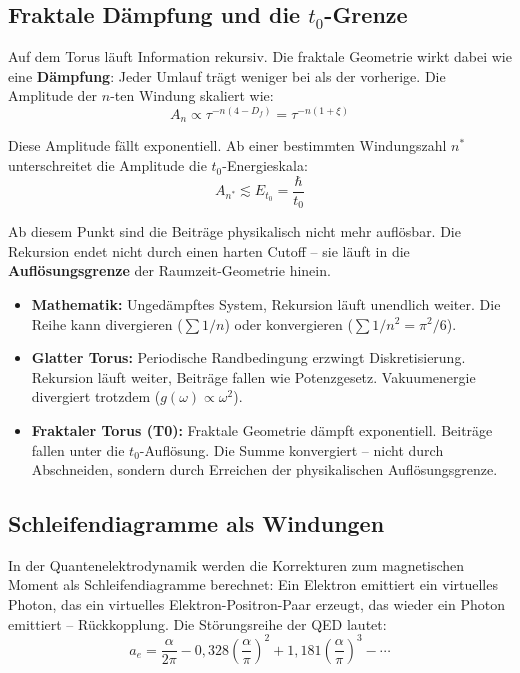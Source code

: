 	\subsection{Fraktale Dämpfung und die $t_0$-Grenze}
	
	Auf dem Torus läuft Information rekursiv. Die fraktale Geometrie wirkt dabei wie eine \textbf{Dämpfung}: Jeder Umlauf trägt weniger bei als der vorherige. Die Amplitude der $n$-ten Windung skaliert wie:
	\begin{equation}
		A_n \propto \tau^{-n(4-D_f)} = \tau^{-n(1+\xi)}
	\end{equation}
	
	Diese Amplitude fällt exponentiell. Ab einer bestimmten Windungszahl $n^*$ unterschreitet die Amplitude die $t_0$-Energieskala:
	\begin{equation}
		A_{n^*} \lesssim E_{t_0} = \frac{\hbar}{t_0}
	\end{equation}
	
	Ab diesem Punkt sind die Beiträge physikalisch nicht mehr auflösbar. Die Rekursion endet nicht durch einen harten Cutoff -- sie läuft in die \textbf{Auflösungsgrenze} der Raumzeit-Geometrie hinein.
	
	\begin{keypoint}
		\begin{itemize}
			\item \textbf{Mathematik:} Ungedämpftes System, Rekursion läuft unendlich weiter. Die Reihe kann divergieren ($\sum 1/n$) oder konvergieren ($\sum 1/n^2 = \pi^2/6$).
			\item \textbf{Glatter Torus:} Periodische Randbedingung erzwingt Diskretisierung. Rekursion läuft weiter, Beiträge fallen wie Potenzgesetz. Vakuumenergie divergiert trotzdem ($g(\omega) \propto \omega^2$).
			\item \textbf{Fraktaler Torus (T0):} Fraktale Geometrie dämpft exponentiell. Beiträge fallen unter die $t_0$-Auflösung. Die Summe konvergiert -- nicht durch Abschneiden, sondern durch Erreichen der physikalischen Auflösungsgrenze.
		\end{itemize}
	\end{keypoint}
	
	\subsection{Schleifendiagramme als Windungen}
	
	In der Quantenelektrodynamik werden die Korrekturen zum magnetischen Moment als Schleifendiagramme berechnet: Ein Elektron emittiert ein virtuelles Photon, das ein virtuelles Elektron-Positron-Paar erzeugt, das wieder ein Photon emittiert -- Rückkopplung. Die Störungsreihe der QED lautet:
	\begin{equation}
		a_e = \frac{\alpha}{2\pi} - 0{,}328 \left(\frac{\alpha}{\pi}\right)^2 + 1{,}181 \left(\frac{\alpha}{\pi}\right)^3 - \cdots
	\end{equation}
	
